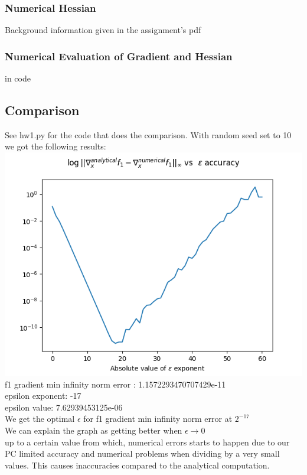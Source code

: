 \documentclass[12pt]{article}
\begin{document}
\subsubsection{Numerical Hessian}
Background information given in the assignment's pdf
\subsubsection{Numerical Evaluation of Gradient and Hessian}
in code

\newpage

\subsection{Comparison}
See hw1.py for the code that does the comparison.
With random seed set to 10 we got the following results:\\
\includegraphics[scale=0.7]{f1_grad_plot}\\
f1 gradient min infinity norm error : 1.1572293470707429e-11\\
epsilon exponent: -17\\
epsilon value: 7.62939453125e-06\\
We get the optimal $\epsilon$ for f1 gradient min infinity norm error at $2^{-17}$\\
We can explain the graph as getting better when $\epsilon \rightarrow 0$\\
up to a certain value from which, numerical errors starts to happen due to our PC limited accuracy and numerical problems when dividing by a very small values.
This causes inaccuracies compared to the analytical computation.
\end{document}
